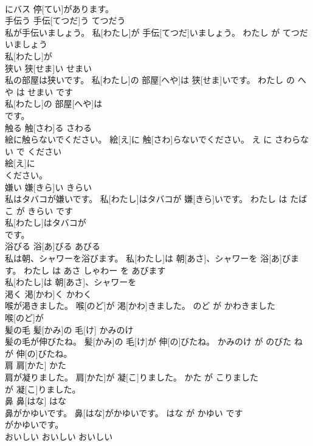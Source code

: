 \documentclass[8pt]{extreport}
\begin{document}
\begin{CJK}{UTF8}{min}
\\	にバス 停[てい]があります。			
\\	手伝う	手伝[てつだ]う	てつだう	
\\	私が手伝いましょう。	私[わたし]が 手伝[てつだ]いましょう。	わたし が てつだいましょう	
\\	私[わたし]が
\\	狭い	狭[せま]い	せまい	
\\	私の部屋は狭いです。	私[わたし]の 部屋[へや]は 狭[せま]いです。	わたし の へや は せまい です	
\\	私[わたし]の 部屋[へや]は
\\	です。			
\\	触る	触[さわ]る	さわる	
\\	絵に触らないでください。	絵[え]に 触[さわ]らないでください。	え に さわらない で ください	
\\	絵[え]に
\\	ください。			
\\	嫌い	嫌[きら]い	きらい	
\\	私はタバコが嫌いです。	私[わたし]はタバコが 嫌[きら]いです。	わたし は たばこ が きらい です	
\\	私[わたし]はタバコが
\\	です。			
\\	浴びる	浴[あ]びる	あびる	
\\	私は朝、シャワーを浴びます。	私[わたし]は 朝[あさ]、シャワーを 浴[あ]びます。	わたし は あさ しゃわー を あびます	
\\	私[わたし]は 朝[あさ]、シャワーを
\\	渇く	渇[かわ]く	かわく	
\\	喉が渇きました。	喉[のど]が 渇[かわ]きました。	のど が かわきました	
\\	喉[のど]が
\\	髪の毛	髪[かみ]の 毛[け]	かみのけ	
\\	髪の毛が伸びたね。	髪[かみ]の 毛[け]が 伸[の]びたね。	かみのけ が のびた ね	
\\	が 伸[の]びたね。			
\\	肩	肩[かた]	かた	
\\	肩が凝りました。	肩[かた]が 凝[こ]りました。	かた が こりました	
\\	が 凝[こ]りました。			
\\	鼻	鼻[はな]	はな	
\\	鼻がかゆいです。	鼻[はな]がかゆいです。	はな が かゆい です	
\\	がかゆいです。			
\\	おいしい	おいしい	おいしい	

\end{CJK}
\end{document}

